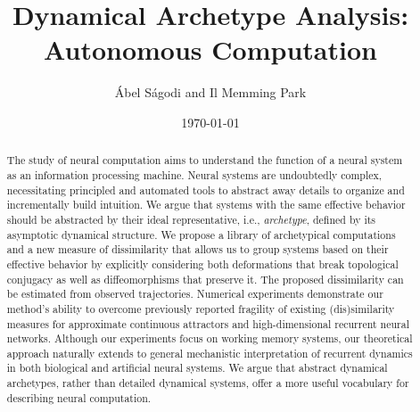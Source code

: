 \documentclass{article}
\title{Dynamical Archetype Analysis:\\Autonomous Computation}
\author{\'Abel S\'agodi and Il Memming Park}
\date{\today}
\theoremstyle{definition} \newtheorem{definition}{Definition}  \newtheorem{example}{Example}
\theoremstyle{remark} \newtheorem{remark}{Remark}
\newcounter{ct}
\begin{document}
\maketitle


\begin{abstract}
The study of neural computation aims to understand the function of a neural system as an information processing machine.
Neural systems are undoubtedly complex, necessitating principled and automated tools to abstract away details to organize and incrementally build intuition.
We argue that systems with the same effective behavior should be abstracted by their ideal representative, i.e., \emph{archetype}, defined by its asymptotic dynamical structure. %
We propose a library of archetypical computations and a new measure of dissimilarity that allows us to group systems based on their effective behavior by explicitly considering both deformations that break topological conjugacy as well as diffeomorphisms that preserve it.
The proposed dissimilarity can be estimated from observed trajectories.
Numerical experiments demonstrate our method's ability to overcome previously reported fragility of existing (dis)similarity measures for approximate continuous attractors and high-dimensional recurrent neural networks.
Although our experiments focus on working memory systems, our theoretical approach naturally extends to general mechanistic interpretation of recurrent dynamics in both biological and artificial neural systems.
We argue that abstract dynamical archetypes, rather than detailed dynamical systems, offer a more useful vocabulary for describing neural computation.
%

\end{abstract}
\end{document}
